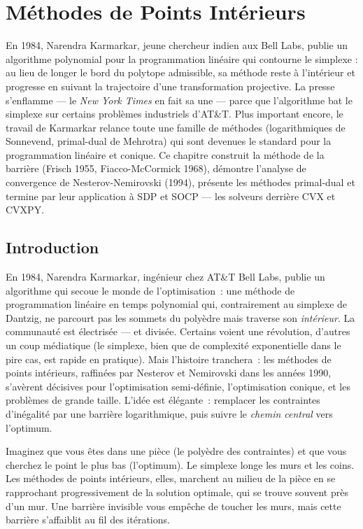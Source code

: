 \chapter{M\'ethodes de Points Int\'erieurs}
\label{ch:points_interieurs}

En 1984, Narendra Karmarkar, jeune chercheur indien aux Bell Labs, publie un algorithme polynomial pour la programmation linéaire qui contourne le simplexe : au lieu de longer le bord du polytope admissible, sa méthode reste à l'intérieur et progresse en suivant la trajectoire d'une transformation projective. La presse s'enflamme --- le \emph{New York Times} en fait sa une --- parce que l'algorithme bat le simplexe sur certains problèmes industriels d'AT\&T. Plus important encore, le travail de Karmarkar relance toute une famille de méthodes (logarithmiques de Sonnevend, primal-dual de Mehrotra) qui sont devenues le standard pour la programmation linéaire et conique. Ce chapitre construit la méthode de la barrière (Frisch 1955, Fiacco-McCormick 1968), démontre l'analyse de convergence de Nesterov-Nemirovski (1994), présente les méthodes primal-dual et termine par leur application à SDP et SOCP --- les solveurs derrière CVX et CVXPY.

\section{Introduction}

En 1984, Narendra Karmarkar, ing\'enieur chez AT\&T Bell Labs, publie un algorithme qui secoue le monde de l'optimisation~: une m\'ethode de programmation lin\'eaire en temps polynomial qui, contrairement au simplexe de Dantzig, ne parcourt pas les sommets du poly\`edre mais traverse son \emph{int\'erieur}. La communaut\'e est \'electris\'ee --- et divis\'ee. Certains voient une r\'evolution, d'autres un coup m\'ediatique (le simplexe, bien que de complexit\'e exponentielle dans le pire cas, est rapide en pratique). Mais l'histoire tranchera~: les m\'ethodes de points int\'erieurs, raffin\'ees par Nesterov et Nemirovski dans les ann\'ees 1990, s'av\`erent d\'ecisives pour l'optimisation semi-d\'efinie, l'optimisation conique, et les probl\`emes de grande taille. L'id\'ee est \'el\'egante~: remplacer les contraintes d'in\'egalit\'e par une barri\`ere logarithmique, puis suivre le \emph{chemin central} vers l'optimum.

\begin{intuition}
Imaginez que vous \^etes dans une pi\`ece (le poly\`edre des contraintes) et
que vous cherchez le point le plus bas (l'optimum). Le simplexe longe les murs
et les coins. Les m\'ethodes de points int\'erieurs, elles, marchent au milieu
de la pi\`ece en se rapprochant progressivement de la solution optimale, qui
se trouve souvent pr\`es d'un mur. Une barri\`ere invisible vous emp\^eche
de toucher les murs, mais cette barri\`ere s'affaiblit au fil des it\'erations.
\end{intuition}


